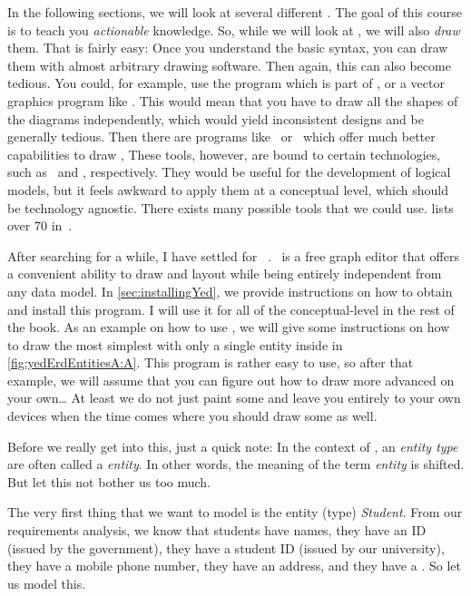 In the following sections, we will look at several different .
The goal of this course is to teach you \emph{actionable} knowledge.
So, while we will look at , we will also \emph{draw} them.
That is fairly easy:
Once you understand the basic syntax, you can draw them with almost arbitrary drawing software.
Then again, this can also become tedious.
You could, for example, use the  program which is part of \libreoffice, or a vector graphics program like \inkscape.
This would mean that you have to draw all the shapes of the diagrams independently, which would yield inconsistent designs and be generally tedious.
Then there are programs like \pgmodeler\ or \mysqlWorkbench\ which offer much better capabilities to draw ,
These tools, however, are bound to certain technologies, such as \postgresql\ and \mysql, respectively.
They would be useful for the development of logical models, but it feels awkward to apply them at a conceptual level, which should be technology agnostic.
There exists many possible tools that we could use.
 lists over 70 in~\cite{B2025DS:7DMTC}.

After searching for a while, I have settled for \yEd~\cite{SG2015MDAWY,Y2011YGEM}.
\yEd\ is a free graph editor that offers a convenient ability to draw and layout  while being entirely independent from any data model.
In \cref{sec:installingYed}, we provide instructions on how to obtain and install this program.
I will use it for all of the conceptual-level  in the rest of the book.
As an example on how to use \yEd, we will give some instructions on how to draw the most simplest  with only a single entity inside in \cref{fig:yedErdEntitiesA:A}.
This program is rather easy to use, so after that example, we will assume that you can figure out how to draw more advanced  on your own\dots
At least we do not just paint some  and leave you entirely to your own devices when the time comes where you should draw some as well.

Before we really get into this, just a quick note:
In the context of , an \emph{entity type} are often called a \emph{entity}.
In other words, the meaning of the term \emph{entity} is shifted.
But let this not bother us too much.

The very first thing that we want to model is the entity (type) \emph{Student}.
From our requirements analysis, we know that students have names, they have an ID (issued by the government), they have a student ID (issued by our university), they have a mobile phone number, they have an address, and they have a .
So let us model this.

